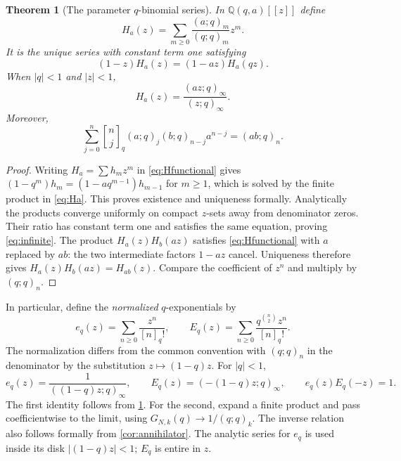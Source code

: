 \documentclass[11pt,a4paper]{article}
\numberwithin{equation}{section}
\newtheorem{theorem}{Theorem}[section]
\theoremstyle{definition}
\theoremstyle{remark}
\newcommand{\Q}{\mathbb Q}
\newcommand{\G}[2]{\genfrac{[}{]}{0pt}{}{#1}{#2}_{q}}
\newcommand{\qfac}[1]{[#1]_q!}
\newcommand{\qp}[2]{(#1;q)_{#2}}
\begin{document}
\begin{theorem}[The parameter $q$-binomial series]
\label{thm:infinite}
In $\Q(q,a)[[z]]$ define
\begin{equation}
 H_a(z)=\sum_{m\ge0}\frac{\qp am}{\qp qm}z^m.
 \label{eq:Ha}
\end{equation}
It is the unique series with constant term one satisfying
\begin{equation}
 (1-z)H_a(z)=(1-az)H_a(qz).
 \label{eq:Hfunctional}
\end{equation}
When $|q|<1$ and $|z|<1$,
\begin{equation}
 H_a(z)=\frac{\qp{az}\infty}{\qp z\infty}.
 \label{eq:infinite}
\end{equation}
Moreover,
\begin{equation}
 \sum_{j=0}^n\G nj\qp aj\qp b{n-j}a^{n-j}=\qp{ab}n.
 \label{eq:parameter-convolution}
\end{equation}
\end{theorem}
\begin{proof}
Writing $H_a=\sum h_mz^m$ in \cref{eq:Hfunctional} gives
$(1-q^m)h_m=(1-aq^{m-1})h_{m-1}$ for $m\ge1$, which is solved by
the finite product in \cref{eq:Ha}. This proves existence and uniqueness
formally. Analytically the products converge uniformly on compact
$z$-sets away from denominator zeros. Their ratio has constant term one
and satisfies the same equation, proving \cref{eq:infinite}.
The product $H_a(z)H_b(az)$ satisfies \cref{eq:Hfunctional} with $a$
replaced by $ab$: the two intermediate factors $1-az$ cancel. Uniqueness
therefore gives $H_a(z)H_b(az)=H_{ab}(z)$. Compare the coefficient of
$z^n$ and multiply by $\qp qn$.
\end{proof}

In particular, define the \emph{normalized} $q$-exponentials by
\begin{equation}
 e_q(z)=\sum_{n\ge0}\frac{z^n}{\qfac n},\qquad
 E_q(z)=\sum_{n\ge0}\frac{q^{\binom n2}z^n}{\qfac n}.
 \label{eq:qexp}
\end{equation}
The normalization differs from the common convention with $(q;q)_n$
in the denominator by the substitution $z\mapsto(1-q)z$.
For $|q|<1$,
\begin{equation}
 e_q(z)=\frac1{\qp{(1-q)z}\infty},\qquad
 E_q(z)=\qp{-(1-q)z}\infty,\qquad e_q(z)E_q(-z)=1.
 \label{eq:qexp-product}
\end{equation}
The first identity follows from \cref{thm:infinite}. For the second,
expand a finite product and pass coefficientwise to the limit, using
$G_{N,k}(q)\to1/(q;q)_k$. The inverse relation also follows formally
from \cref{cor:annihilator}. The analytic series for $e_q$ is used
inside its disk $|(1-q)z|<1$; $E_q$ is entire in $z$.
\end{document}
